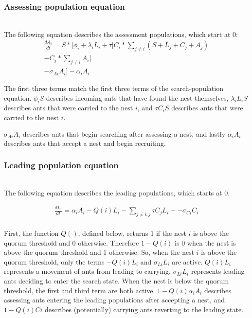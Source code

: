 \documentclass{article}
\begin{document}
\subsubsection{Assessing population equation}
\hfill\\

The following equation describes the assessment populations, which start at $0$:
\begin{multline}
     \frac{dA_i}{dt} = S * [\phi_i + \lambda_iL_i + \tau \big[ C_i * \sum_{j \neq i}{(S + L_j + C_j + A_j)} \\ - C_j * \sum_{j \neq i}{A_i} \big] \\ - \sigma_{Ai}A_i] - \alpha_iA_i 
\end{multline}

The first three terms match the first three terms of the search-population equation.
$\phi_iS$ describes incoming ants that have found the nest themselves, $\lambda_iL_iS$ describes ants that were carried to the nest $i$, and $\tau C_iS$ describes ants that were carried to the nest $i$.

$\sigma_{Ai}A_i$ describes ants that begin searching after assessing a nest, and lastly $\alpha_iA_i$ describes ants that accept a nest and begin recruiting.

\subsubsection{Leading population equation}
\hfill\\

The following equation describes the leading populations, which starts at $0$.

\begin{multline}
        \frac{dL_i}{dt} = \alpha_iA_i - Q(i)L_i - \sum_{j \neq i, j} \tau C_jL_i - - \sigma_{Ci}C_i \\
\end{multline}

First, the function $Q()$, defined below, returns $1$ if the nest $i$ is above the quorum threshold and $0$ otherwise. Therefore $1 - Q(i)$ is $0$ when the nest is above the quorum threshold and $1$ otherwise.
So, when the nest $i$ is above the quorum threshold, only the terms $-Q(i)L_i$ and $\sigma_{Li}L_i$ are active. $Q(i)L_i$ represents a movement of ants from leading to carrying. $\sigma_{Li}L_i$ represents leading ants deciding to enter the search state.
When the nest is below the quorum threshold, the first and third term are both active. $1-Q(i)\alpha_iA_i$ describes assessing ants entering the leading populations after accepting a nest, and $1-Q(i)Ci$ describes (potentially) carrying ants reverting to the leading state.
\end{document}
